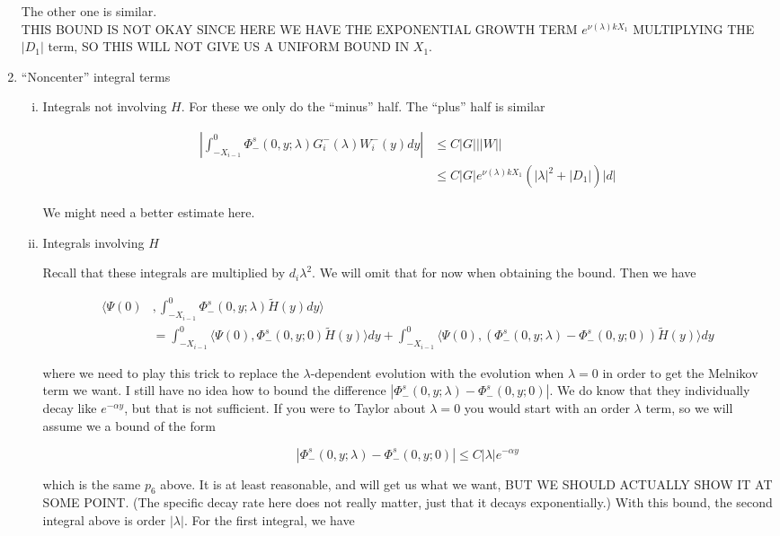 \documentclass[12pt]{article}
\begin{document}
\begin{enumerate}
The other one is similar.\\

THIS BOUND IS NOT OKAY SINCE HERE WE HAVE THE EXPONENTIAL GROWTH TERM $e^{\nu(\lambda)k X_1}$ MULTIPLYING THE $|D_1|$ term, SO THIS WILL NOT GIVE US A UNIFORM BOUND IN $X_1$.

\item ``Noncenter'' integral terms

\begin{enumerate}[(i)]

\item Integrals not involving $H$. For these we only do the ``minus'' half. The ``plus'' half is similar

\begin{align*}
\left| \int_{-X_{i-1}}^0 \Phi^s_-(0, y; \lambda) G_i^-(\lambda)W_i^-(y) dy \right| 
&\leq C |G| ||W|| \\
&\leq C |G| e^{\nu(\lambda)k X_1} ( |\lambda|^2 + |D_1| )|d|
\end{align*}

We might need a better estimate here.

\item Integrals involving $H$

Recall that these integrals are multiplied by $d_i \lambda^2$. We will omit that for now when obtaining the bound. Then we have

\begin{align*}
\langle \Psi(0)&, \int_{-X_{i-1}}^0 \Phi^s_-(0, y; \lambda) \tilde{H}(y) dy \rangle \\ 
&= \int_{-X_{i-1}}^0 \langle \Psi(0), \Phi^s_-(0, y; 0) \tilde{H}(y) \rangle dy + 
\int_{-X_{i-1}}^0 \langle \Psi(0), (\Phi^s_-(0, y; \lambda) - \Phi^s_-(0, y; 0)) \tilde{H}(y) \rangle dy
\end{align*}

where we need to play this trick to replace the $\lambda$-dependent evolution with the evolution when $\lambda = 0$ in order to get the Melnikov term we want. I still have no idea how to bound the difference $|\Phi^s_-(0, y; \lambda) - \Phi^s_-(0, y; 0)|$. We do know that they individually decay like $e^{-\alpha y}$, but that is not sufficient. If you were to Taylor about $\lambda = 0$ you would start with an order $\lambda$ term, so we will assume we a bound of the form

\[
|\Phi^s_-(0, y; \lambda) - \Phi^s_-(0, y; 0)| \leq C |\lambda| e^{-\alpha y}
\]

which is the same $p_6$ above. It is at least reasonable, and will get us what we want, BUT WE SHOULD ACTUALLY SHOW IT AT SOME POINT. (The specific decay rate here does not really matter, just that it decays exponentially.) With this bound, the second integral above is order $|\lambda|$. For the first integral, we have 


\end{enumerate}
\end{enumerate}
\end{document}

